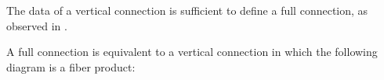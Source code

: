 
The data of a vertical connection is sufficient to define a full connection, as observed in \cite{LucyshynWright2018}.
\begin{lemma}
    A full connection is equivalent to a vertical connection in which the following diagram is a fiber product:
    
\end{lemma}



